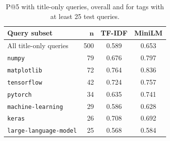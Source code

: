 \begin{table}[H]
  \centering\small
  \caption{P@5 with title-only queries, overall and for tags with at least 25 test queries.}
  \label{tab:title}
  \begin{tabular}{|l|r|c|c|}
    \hline
    \textbf{Query subset} & $\mathbf{n}$ & \textbf{TF-IDF} & \textbf{MiniLM} \\
    \hline
    All title-only queries         & 500 & 0.589 & 0.653 \\
    \hline
    \texttt{numpy}                 & 79 & 0.676 & 0.797 \\
    \hline
    \texttt{matplotlib}            & 72 & 0.764 & 0.836 \\
    \hline
    \texttt{tensorflow}            & 42 & 0.724 & 0.757 \\
    \hline
    \texttt{pytorch}               & 34 & 0.635 & 0.741 \\
    \hline
    \texttt{machine-learning}      & 29 & 0.586 & 0.628 \\
    \hline
    \texttt{keras}                 & 26 & 0.708 & 0.692 \\
    \hline
    \texttt{large-language-model}  & 25 & 0.568 & 0.584 \\
    \hline
  \end{tabular}
\end{table}
